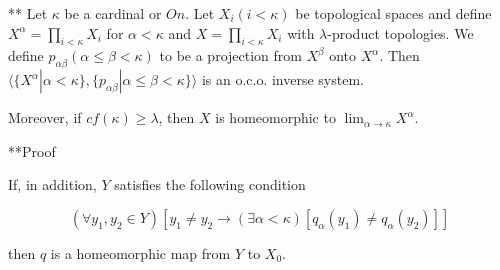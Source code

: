 ** Let $\kappa$ be a cardinal or $On$. Let $X_i (i < \kappa)$ be topological spaces and define $X^\alpha = \prod_{i < \kappa} X_i$ for $\alpha < \kappa$ and $X = \prod_{i < \kappa} X_i$ with $\lambda$-product topologies. We define $p_{\alpha\beta} (\alpha \leq \beta < \kappa)$ to be a projection from $X^\beta$ onto $X^\alpha$. Then $\langle \{X^\alpha | \alpha < \kappa\}, \{p_{\alpha\beta} | \alpha \leq \beta < \kappa\} \rangle$ is an o.c.o. inverse system.

Moreover, if $cf(\kappa) \geq \lambda$, then $X$ is homeomorphic to $\lim_{\alpha \rightarrow \kappa} X^\alpha$.

**Proof

If, in addition, $Y$ satisfies the following condition

$$(\forall y_1, y_2 \in Y)[y_1 \neq y_2 \rightarrow (\exists \alpha < \kappa)[q_\alpha(y_1) \neq q_\alpha(y_2)]]$$

then $q$ is a homeomorphic map from $Y$ to $X_0$.
